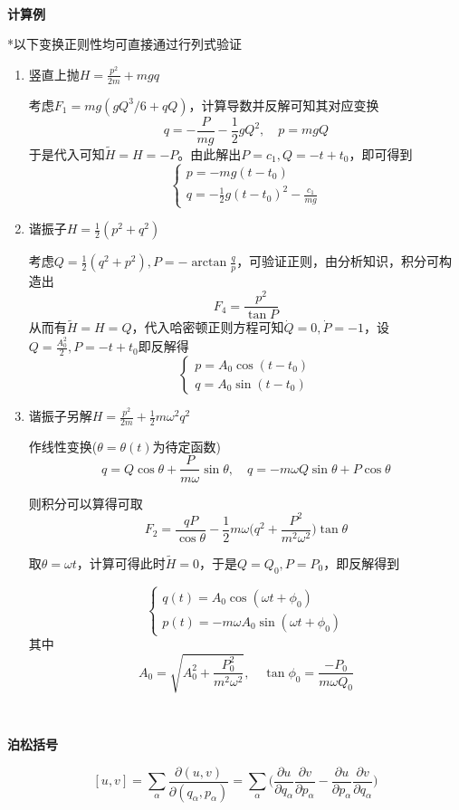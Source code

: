 \documentclass[a4paper,UTF8,fontset=windows]{ctexart}
\begin{document}
\

\textbf{计算例}

*以下变换正则性均可直接通过行列式验证

\begin{enumerate}
    \item 竖直上抛$H=\frac{p^2}{2m}+mgq$

    考虑$F_1=mg(gQ^3/6+qQ)$，计算导数并反解可知其对应变换
    $$q=-\frac{P}{mg}-\frac{1}{2}gQ^2,\quad p=mgQ$$
    于是代入可知$\tilde{H}=H=-P$。由此解出$P=c_1,Q=-t+t_0$，即可得到
    $$\begin{cases}p=-mg(t-t_0)\\q=-\frac{1}{2}g(t-t_0)^2-\frac{c_1}{mg}\end{cases}$$

    \item 谐振子$H=\frac{1}{2}(p^2+q^2)$
    
    考虑$Q=\frac{1}{2}(q^2+p^2),P=-\arctan\frac{q}{p}$，可验证正则，由分析知识，积分可构造出
    $$F_4=\frac{p^2}{\tan P}$$
    从而有$\tilde{H}=H=Q$，代入哈密顿正则方程可知$\dot{Q}=0,\dot{P}=-1$，设$Q=\frac{A_0^2}{2},P=-t+t_0$即反解得
    $$\begin{cases}p=A_0\cos(t-t_0)\\ q=A_0\sin(t-t_0)\end{cases}$$

    \item 谐振子另解$H=\frac{p^2}{2m}+\frac{1}{2}m\omega^2q^2$

    作线性变换($\theta=\theta(t)$为待定函数)
    $$q=Q\cos\theta+\frac{P}{m\omega}\sin\theta,\quad q=-m\omega Q\sin\theta+P\cos\theta$$

    则积分可以算得可取
    $$F_2=\frac{qP}{\cos\theta}-\frac{1}{2}m\omega\bigg(q^2+\frac{P^2}{m^2\omega^2}\bigg)\tan\theta$$

    取$\theta=\omega t$，计算可得此时$\tilde{H}=0$，于是$Q=Q_0,P=P_0$，即反解得到

    $$\begin{cases}q(t)=A_0\cos(\omega t+\phi_0)\\ p(t)=-m\omega A_0\sin(\omega t+\phi_0)\end{cases}$$
    其中
    $$A_0=\sqrt{A_0^2+\frac{P_0^2}{m^2\omega^2}},\quad\tan\phi_0=\frac{-P_0}{m\omega Q_0}$$
\end{enumerate}

\

\textbf{泊松括号}

$$[u,v]=\sum_\alpha\frac{\partial(u,v)}{\partial(q_\alpha,p_\alpha)}=\sum_\alpha\bigg(\frac{\partial u}{\partial q_\alpha}\frac{\partial v}{\partial p_\alpha}-\frac{\partial u}{\partial p_\alpha}\frac{\partial v}{\partial q_\alpha}\bigg)$$
\end{document}
